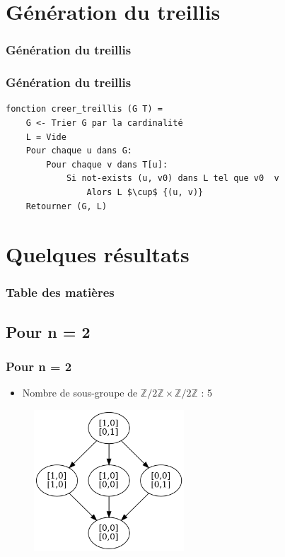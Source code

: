 \documentclass{beamer}
\begin{document}
\section{Génération du treillis}
\begin{frame}
\frametitle{Génération du treillis}
\tableofcontents[currentsection]
\end{frame}

\begin{frame}[fragile]
\frametitle{Génération du treillis}
\begin{verbatim}
fonction creer_treillis (G T) =
    G <- Trier G par la cardinalité
    L = Vide
    Pour chaque u dans G:
        Pour chaque v dans T[u]:
            Si not-exists (u, v0) dans L tel que v0  v
                Alors L $\cup$ {(u, v)}
    Retourner (G, L)
\end{verbatim}
\end{frame}


\section{Quelques résultats}
\begin{frame}
\frametitle{Table des matières}
\tableofcontents[currentsection]
\end{frame}


\subsection{Pour n = 2}
\begin{frame}
\frametitle{Pour n = 2}
\begin{itemize}
    \item Nombre de sous-groupe de $\mathbb{Z}/2\mathbb{Z} \times \mathbb{Z}/2\mathbb{Z}$ : 5
\end{itemize}
\begin{figure}
  \centering
  \includegraphics[width=0.5\textwidth]{Z2ZxZ2Z.png}
\end{figure}
\end{frame}
\end{document}

